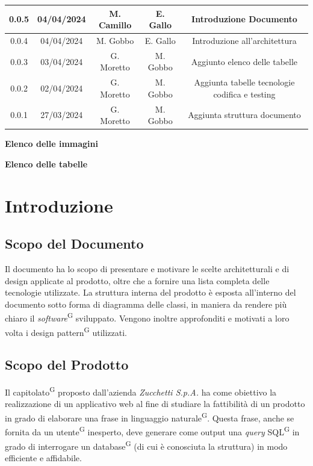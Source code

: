 \documentclass[5pt]{article}
\begin{document}
\begin{table}[H]
{\begin{tabular}{|c|c|c|c|c|}
				0.0.5 & 04/04/2024 & M. Camillo & E. Gallo & Introduzione Documento \\
                \hline
				0.0.4 & 04/04/2024 & M. Gobbo & E. Gallo & Introduzione all'architettura \\
				\hline
				0.0.3 & 03/04/2024 & G. Moretto & M. Gobbo & Aggiunto elenco delle tabelle \\
				\hline
				0.0.2 & 02/04/2024 & G. Moretto & M. Gobbo & Aggiunta tabelle tecnologie codifica e testing \\
				\hline
				0.0.1 & 27/03/2024 & G. Moretto & M. Gobbo & Aggiunta struttura documento \\
				\hline
			\end{tabular}
		}
		\label{tab:conference}
	\end{table}
	
	\pagebreak
	\tableofcontents
	\pagebreak
	\textbf{\Large Elenco delle immagini} \\
	\makeatletter
	\makeatother
	
	\pagebreak
	\textbf{\Large Elenco delle tabelle} \\
	\makeatletter
	\makeatother
	\pagebreak
	
	\section{Introduzione}
	
	\subsection{Scopo del Documento}

    Il documento ha lo scopo di presentare e motivare le scelte architetturali e di design applicate al prodotto, oltre che a fornire una lista completa delle tecnologie utilizzate. La struttura interna del prodotto è esposta all'interno del documento sotto forma di diagramma delle classi, in maniera da rendere più chiaro il \textit{software}\textsuperscript{G} sviluppato. Vengono inoltre approfonditi e motivati a loro volta i design pattern\textsuperscript{G} utilizzati. 
	
	\subsection{Scopo del Prodotto}
    Il capitolato\textsuperscript{G} proposto dall'azienda \textit{Zucchetti S.p.A.} ha come obiettivo la realizzazione di un applicativo web al fine di studiare la fattibilità di un prodotto in grado di elaborare una frase in linguaggio naturale\textsuperscript{G}. Questa frase, anche se fornita da un utente\textsuperscript{G} inesperto, deve generare come output una \textit{query} SQL\textsuperscript{G} in grado di interrogare un database\textsuperscript{G} (di cui è conosciuta la struttura) in modo efficiente e affidabile.
	
\end{document}
